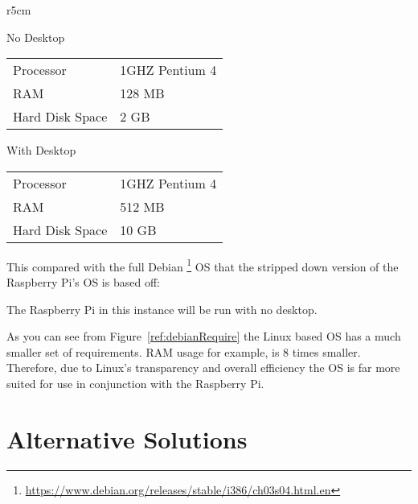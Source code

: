\begin{wrapfigure}{r}{5cm}
\begin{center}
No Desktop\\
\begin{tabular}{| l | l |}
	\hline
	Processor & 1GHZ Pentium 4 \\
	RAM & 128 MB \\
	Hard Disk Space & 2 GB \\
	\hline
\end{tabular}

\vspace{2.5mm}

With Desktop\\
\begin{tabular}{| l | l |}
	\hline
	Processor & 1GHZ Pentium 4 \\
	RAM & 512 MB \\
	Hard Disk Space & 10 GB \\
	\hline
\end{tabular}
\caption{Debian system requirements}
\label{ref:debianRequire}
\end{center}
\end{wrapfigure}

This compared with the full Debian \footnote{\url{https://www.debian.org/releases/stable/i386/ch03s04.html.en}} OS that the stripped down version of the Raspberry Pi's OS is based off:

The Raspberry Pi in this instance will be run with no desktop.

As you can see from Figure~\ref{ref:debianRequire} the Linux based OS has a much smaller set of requirements. RAM usage for example, is 8 times smaller. Therefore, due to Linux's transparency and overall efficiency the OS is far more suited for use in conjunction with the Raspberry Pi. 

\clearpage
\section{Alternative Solutions}
